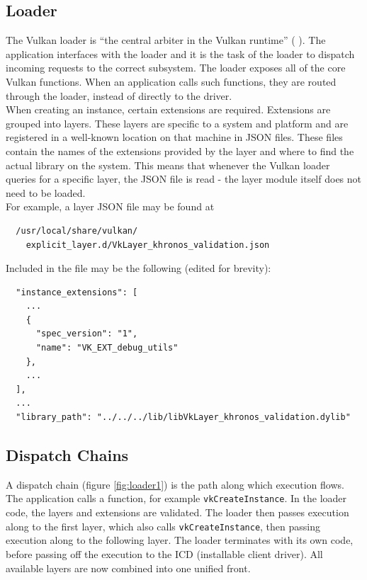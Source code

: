 \documentclass[12pt]{report}
\newcommand{\citebu}[1]{(\citenoparen{#1})}
\newcommand{\citenoparen}[1]{\citeauthor{#1} \citeyear{#1}}
\theoremstyle{definition}
\begin{document}
      \subsection{Loader}

      The Vulkan loader is ``the central arbiter in the Vulkan runtime'' \citebu{renderdoc}.
      The application interfaces with the loader and it is the task of the
      loader to dispatch incoming requests to the correct subsystem. The
      loader exposes all of the core Vulkan functions. When an application
      calls such functions, they are routed through the loader, instead of
      directly to the driver. \\

      When creating an instance, certain extensions are required. Extensions
      are grouped into layers. These layers are specific to a system and
      platform and are registered in a well-known location on that machine
      in JSON files. These files contain the names of the extensions provided
      by the layer and where to find the actual library on the system. This
      means that whenever the Vulkan loader queries for a specific layer, the
      JSON file is read - the layer module itself does not need to be loaded. \\

      For example, a layer JSON file may be found at \\

      \begin{lstlisting}
  /usr/local/share/vulkan/
    explicit_layer.d/VkLayer_khronos_validation.json
      \end{lstlisting}
      \vspace{5mm}

      Included in the file may be the following (edited for brevity):

      \begin{lstlisting}
  "instance_extensions": [
    ...
    {   
      "spec_version": "1", 
      "name": "VK_EXT_debug_utils"
    },
    ...
  ],
  ...
  "library_path": "../../../lib/libVkLayer_khronos_validation.dylib"
      \end{lstlisting}
      \vspace{5mm}

      \subsection{Dispatch Chains}

      A dispatch chain (figure \ref{fig:loader1}) is the path along which execution flows. The application
      calls a function, for example \texttt{vkCreateInstance}. In the loader code, the
      layers and extensions are validated. The loader then passes execution
      along to the first layer, which also calls \texttt{vkCreateInstance}, then
      passing execution along to the following layer. The loader terminates
      with its own code, before passing off the execution to the ICD
      (installable client driver). All available layers are now combined
      into one unified front.
\end{document}
